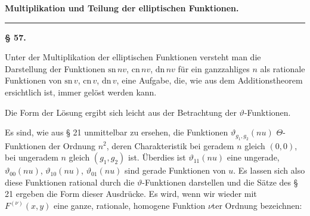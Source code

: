 
\begin{center}

\textbf{Multiplikation und Teilung der elliptischen Funktionen.}
\end{center}

\bigskip
\begin{center}
\rule{2cm}{0.4pt}
\end{center}
\bigskip

\begin{center}
\textbf{§ 57. }
\end{center}

Unter der Multiplikation der elliptischen Funktionen versteht man
die Darstellung der Funktionen $\mathrm{sn}\,nv$, $\mathrm{cn}\,nv$,
$\mathrm{dn}\,nv$ für ein ganzzahliges $n$ als rationale Funktionen
von $\mathrm{sn}\,v$, $\mathrm{cn}\,v$, $\mathrm{dn}\,v$, eine
Aufgabe, die, wie aus dem Additionstheorem ersichtlich ist, immer
gelöst werden kann.

Die Form der Lösung ergibt sich leicht aus der Betrachtung der
$\vartheta$-Funktionen.

Es sind, wie aus § 21 unmittelbar zu ersehen, die Funktionen
$\vartheta_{g_1,g_2}(nu)$ $\Theta$-Funktionen der Ordnung $n^2$,
deren Charakteristik bei geradem $n$ gleich $(0,0)$, bei ungeradem
$n$ gleich $(g_1,g_2)$ ist. Überdies ist $\vartheta_{11}(nu)$ eine
ungerade, $\vartheta_{00}(nu)$, $\vartheta_{10}(nu)$,
$\vartheta_{01}(nu)$ sind gerade Funktionen von $u$. Es lassen sich
also diese Funktionen rational durch die $\vartheta$-Funktionen
darstellen und die Sätze des § 21 ergeben die Form dieser
Ausdrücke. Es wird, wenn wir wieder mit $F^{(\nu)}(x,y)$ eine
ganze, rationale, homogene Funktion $\nu$ter Ordnung bezeichnen:




